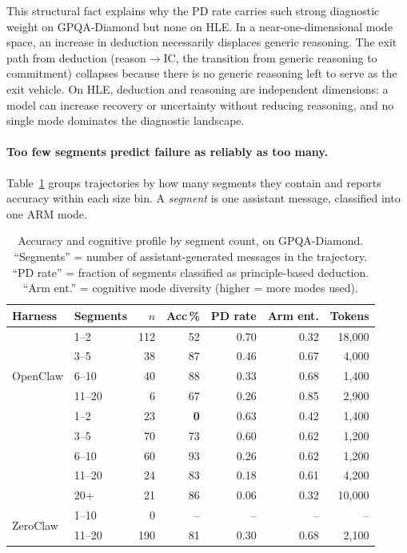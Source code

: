 This structural fact explains why the PD rate carries such strong diagnostic
weight on GPQA-Diamond but none on HLE.
In a near-one-dimensional mode space, an increase in deduction necessarily
displaces generic reasoning.
The exit path from deduction (reason$\to$IC, the transition from generic
reasoning to commitment) collapses because there is no generic reasoning
left to serve as the exit vehicle.
On HLE, deduction and reasoning are independent dimensions: a model can
increase recovery or uncertainty without reducing reasoning, and no single
mode dominates the diagnostic landscape.

\paragraph{Too few segments predict failure as reliably as too many.}

Table~\ref{tab:arm-segment-bins} groups trajectories by how many segments
they contain and reports accuracy within each size bin.
A \emph{segment} is one assistant message, classified into one ARM mode.

\begin{table}[t]
\centering
\small
\caption{%
  Accuracy and cognitive profile by segment count, on GPQA-Diamond.
  ``Segments'' = number of assistant-generated messages in the trajectory.
  ``PD rate'' = fraction of segments classified as principle-based deduction.
  ``Arm ent.'' = cognitive mode diversity (higher = more modes used).
}
\label{tab:arm-segment-bins}
\setlength{\tabcolsep}{3pt}
\begin{tabular}{llrrrrr}
\toprule
Harness & Segments & $n$ & Acc\,\% & PD rate & Arm ent. & Tokens \\
\midrule
\multirow{5}{*}{OpenClaw}
  & 1--2   & 112 &  52 & 0.70 & 0.32 & 18{,}000 \\
  & 3--5   &  38 &  87 & 0.46 & 0.67 &  4{,}000 \\
  & 6--10  &  40 &  88 & 0.33 & 0.68 &  1{,}400 \\
  & 11--20 &   6 &  67 & 0.26 & 0.85 &  2{,}900 \\
\midrule
\multirow{5}{*}{OpenCode}
  & 1--2   &  23 &  \textbf{0} & 0.63 & 0.42 &  1{,}400 \\
  & 3--5   &  70 &  73 & 0.60 & 0.62 &  1{,}200 \\
  & 6--10  &  60 &  93 & 0.26 & 0.62 &  1{,}200 \\
  & 11--20 &  24 &  83 & 0.18 & 0.61 &  4{,}200 \\
  & 20+    &  21 &  86 & 0.06 & 0.32 & 10{,}000 \\
\midrule
\multirow{2}{*}{ZeroClaw}
  & 1--10  &   0 & -- & --  & --  & -- \\
  & 11--20 & 190 &  81 & 0.30 & 0.68 &  2{,}100 \\
\bottomrule
\end{tabular}
\end{table}

